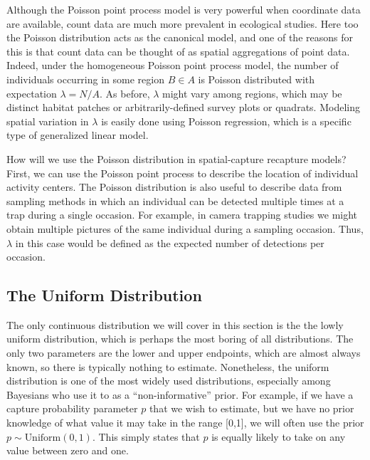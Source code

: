 Although the Poisson point process model is very powerful when
coordinate data are available, count data are much more prevalent in
ecological studies. Here too the Poisson distribution acts as the
canonical model, and one of the reasons for this is that count data
can be thought of as spatial aggregations of point data.
Indeed, under the homogeneous Poisson point process model,
the number of individuals occurring in some
region $B \in A$ is Poisson distributed with expectation
$\lambda = N/A$. As before, $\lambda$ might vary among regions, which
may be distinct habitat patches or arbitrarily-defined survey plots or
quadrats. Modeling spatial variation in $\lambda$ is easily done using
Poisson regression, which is a specific type of generalized linear
model.

How will we use the Poisson distribution in spatial-capture recapture
models? First, we can use the Poisson point process to describe the
location of individual activity centers. The Poisson distribution is
also useful to describe data from sampling methods in which an
individual can be detected multiple times at a trap during a single
occasion. For example, in camera trapping studies we might obtain
multiple pictures of the same individual during a sampling
occasion. Thus, $\lambda$ in this case would be defined as the
expected number of detections per occasion.



\subsection{The Uniform Distribution}

The only continuous distribution we will cover in this section is the
the lowly uniform distribution, which is perhaps the most boring of all
distributions.
The only two parameters are the lower and upper endpoints,
which are almost always known, so there is typically nothing to
estimate. Nonetheless, the uniform
distribution is one of the most widely used distributions,
especially among Bayesians who use it to as a ``non-informative''
prior. %
For example, if we
have a capture probability parameter $p$ that we wish to estimate, but
we have no prior knowledge of what value it may take in the range
[0,1], we will often use the prior $p \sim \text{Uniform}(0,1)$. This
simply states that $p$ is equally likely to take on any value between
zero and one.

